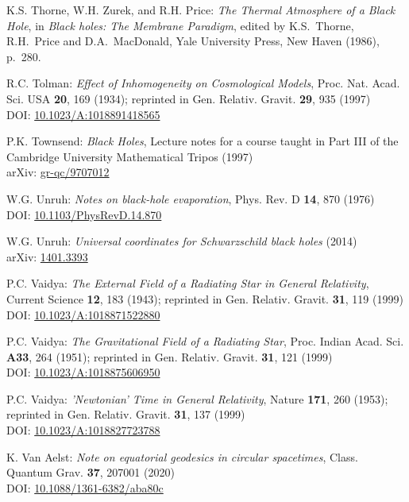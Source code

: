 \begin{thebibliography}{123}
K.S. Thorne, W.H. Zurek, and R.H. Price:
{\em The Thermal Atmosphere of a Black Hole},
in {\em Black holes: The Membrane Paradigm},
edited by  K.S.~Thorne, R.H.~Price and D.A.~MacDonald,
Yale University Press, New Haven (1986), p.~280.

R.C. Tolman:
{\em Effect of Inhomogeneity on Cosmological Models},
Proc. Nat. Acad. Sci. USA {\bf 20}, 169 (1934);
reprinted in Gen. Relativ. Gravit. {\bf 29}, 935 (1997)\\
DOI: \href{https://doi.org/10.1023/A:1018891418565}{10.1023/A:1018891418565}

P.K. Townsend: {\em Black Holes}, Lecture notes for a course taught in Part III
of the Cambridge University Mathematical Tripos (1997)\\
arXiv: \href{https://arxiv.org/abs/gr-qc/9707012}{gr-qc/9707012}

W.G. Unruh: {\em Notes on black-hole evaporation},
Phys. Rev. D {\bf 14}, 870 (1976)\\
DOI: \href{https://doi.org/10.1103/PhysRevD.14.870}{10.1103/PhysRevD.14.870}

W.G. Unruh: {\em Universal coordinates for Schwarzschild black holes} (2014)\\
arXiv: \href{https://arxiv.org/abs/1401.3393}{1401.3393}

P.C. Vaidya:
{\em The External Field of a Radiating Star in General Relativity},
Current Science {\bf 12}, 183 (1943);
reprinted in Gen. Relativ. Gravit. {\bf 31}, 119 (1999)\\
DOI: \href{https://doi.org/10.1023/A:1018871522880}{10.1023/A:1018871522880}

P.C. Vaidya:
{\em The Gravitational Field of a Radiating Star},
Proc. Indian Acad. Sci. {\bf A33}, 264 (1951);
reprinted in Gen. Relativ. Gravit. {\bf 31}, 121 (1999)\\
DOI: \href{https://doi.org/10.1023/A:1018875606950}{10.1023/A:1018875606950}

P.C. Vaidya:
{\em 'Newtonian' Time in General Relativity},
Nature {\bf 171}, 260 (1953);
reprinted in Gen. Relativ. Gravit. {\bf 31}, 137 (1999)\\
DOI: \href{https://doi.org/10.1023/A:1018827723788}{10.1023/A:1018827723788}

K. Van Aelst: {\em Note on equatorial geodesics in circular spacetimes},
Class. Quantum Grav. {\bf 37}, 207001 (2020)\\
DOI: \href{https://doi.org/10.1088/1361-6382/aba80c}{10.1088/1361-6382/aba80c}


\end{thebibliography}
